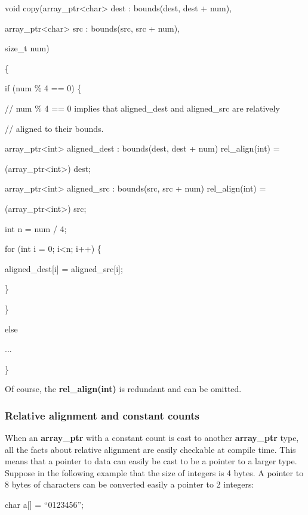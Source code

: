 \documentclass[]{article}
\begin{document}
void copy(array\_ptr\textless{}char\textgreater{} dest : bounds(dest,
dest + num),

array\_ptr\textless{}char\textgreater{} src : bounds(src, src + num),

size\_t num)

\{

if (num \% 4 == 0) \{

// num \% 4 == 0 implies that aligned\_dest and aligned\_src are
relatively

// aligned to their bounds.

array\_ptr\textless{}int\textgreater{} aligned\_dest : bounds(dest, dest
+ num) rel\_align(int) =

(array\_ptr\textless{}int\textgreater{}) dest;

array\_ptr\textless{}int\textgreater{} aligned\_src : bounds(src, src +
num) rel\_align(int) =

(array\_ptr\textless{}int\textgreater{}) src;

int n = num / 4;

for (int i = 0; i\textless{}n; i++) \{

aligned\_dest{[}i{]} = aligned\_src{[}i{]};

\}

\}

else

...

\}

Of course, the \textbf{rel\_align(int)} is redundant and can be omitted.

\subsubsection{\texorpdfstring{\protect\hypertarget{ux5fToc437460762}{}{\protect\hypertarget{ux5fToc440445440}{}{\protect\hypertarget{ux5fToc440449222}{}{\protect\hypertarget{ux5fToc440551872}{}{}}}}Relative
alignment and constant
counts}{Relative alignment and constant counts}}\label{relative-alignment-and-constant-counts}

When an \textbf{array\_ptr} with a constant count is cast to another
\textbf{array\_ptr} type, all the facts about relative alignment are
easily checkable at compile time. This means that a pointer to data can
easily be cast to be a pointer to a larger type. Suppose in the
following example that the size of integers is 4 bytes. A pointer to 8
bytes of characters can be converted easily a pointer to 2 integers:

char a{[}{]} = ``0123456'';
\end{document}
